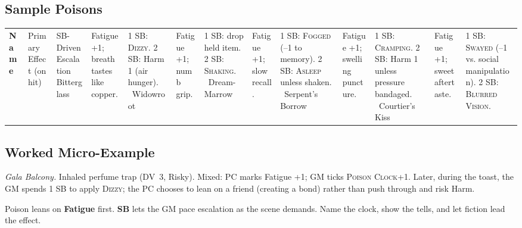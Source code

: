 \subsection*{Sample Poisons}
\begin{tabularx}{\linewidth}{>{\bfseries}l X X}
\toprule
Name & Primary Effect (on hit) & SB-Driven Escalation \
\midrule
Bitterglass & Fatigue +1; breath tastes like copper. & 1 SB: \textsc{Dizzy}. 2 SB: Harm 1 (air hunger). \
Widowroot & Fatigue +1; numb grip. & 1 SB: drop held item. 2 SB: \textsc{Shaking}. \
Dream-Marrow & Fatigue +1; slow recall. & 1 SB: \textsc{Fogged} (–1 to memory). 2 SB: \textsc{Asleep} unless shaken. \
Serpent’s Borrow & Fatigue +1; swelling puncture. & 1 SB: \textsc{Cramping}. 2 SB: Harm 1 unless pressure bandaged. \
Courtier’s Kiss & Fatigue +1; sweet aftertaste. & 1 SB: \textsc{Swayed} (–1 vs. social manipulation). 2 SB: \textsc{Blurred Vision}. \
\bottomrule
\end{tabularx}

\subsection*{Worked Micro-Example}
\emph{Gala Balcony.} Inhaled perfume trap (DV~3, Risky). Mixed: PC marks Fatigue +1; GM ticks \textsc{Poison Clock}+1. Later, during the toast, the GM spends 1 SB to apply \textsc{Dizzy}; the PC chooses to lean on a friend (creating a bond) rather than push through and risk Harm.

\begin{tcolorbox}[title={Summary},colback=gray!5,colframe=black]
\small Poison leans on \textbf{Fatigue} first. \textbf{SB} lets the GM pace escalation as the scene demands. Name the clock, show the tells, and let fiction lead the effect.
\end{tcolorbox}
